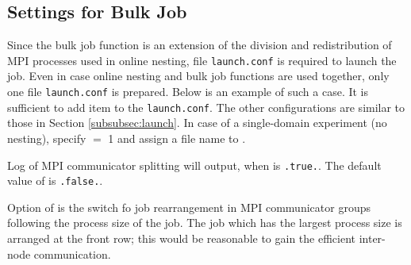 \subsection{Settings for Bulk Job}
Since the bulk job function is an extension of the division and redistribution of MPI processes used in online nesting, file \verb|launch.conf| is required to launch the job. Even in case online nesting and bulk job functions are used together, only one file \verb|launch.conf| is prepared.
Below is an example of such a case.
It is sufficient to add item  to the \verb|launch.conf|. The other configurations are similar to those in Section \ref{subsubsec:launch}. In case of a single-domain experiment (no nesting), specify  $=$ 1 and assign a file name to .

Log of MPI communicator splitting will output, when  is \verb|.true.|.
The default value of  is \verb|.false.|.

Option of  is the switch fo job rearrangement in MPI communicator groups following the process size of the job. The job which has the largest process size is arranged at the front row;
this would be reasonable to gain the efficient inter-node communication.


